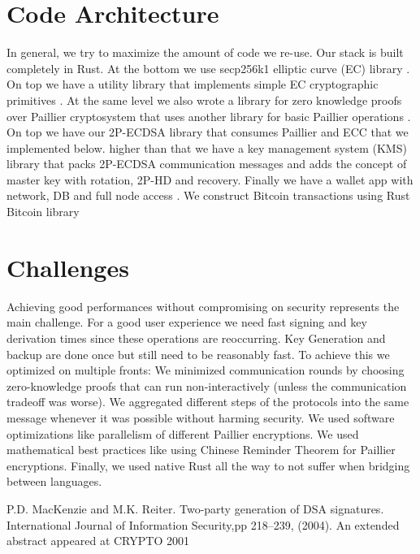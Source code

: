 \documentclass[runningheads]{llncs}
\begin{document}
{{\section{Code Architecture}
In general, we try to maximize the amount of code we re-use. Our stack is built completely in Rust. At the bottom we use secp256k1 elliptic curve (EC) library \cite{secp}. On top we have a utility library that implements simple EC cryptographic primitives \cite{curv}. At the same level we also wrote a library for zero knowledge proofs over Paillier cryptosystem \cite{zk-paillier} that uses another library for basic Paillier operations \cite{paillier}. On top we have our 2P-ECDSA library \cite{ecdsa} that consumes Paillier and ECC that we implemented below. higher than that we have a key management system (KMS) library \cite{kms} that packs 2P-ECDSA communication messages and adds the concept of master key with rotation, 2P-HD and recovery. Finally we have a wallet app with network, DB and full node access \cite{gotham}. We construct Bitcoin transactions using Rust Bitcoin library \cite{rust-bitcoin}

\section{Challenges}
Achieving good performances without compromising on security represents the main challenge. For a good user experience we need fast signing and key derivation times since these operations are reoccurring. Key Generation and backup are done once but still need to be reasonably fast. To achieve this we optimized on multiple fronts:  We minimized communication rounds by choosing zero-knowledge proofs that can run non-interactively (unless the communication tradeoff was worse). We aggregated different steps of the protocols into the same message whenever it was possible without harming security. We used software optimizations like parallelism of different Paillier encryptions. We used mathematical best practices like using Chinese Reminder Theorem for Paillier encryptions. Finally, we used native Rust all the way to not suffer when bridging between languages. 

\begin{thebibliography}{8}
P.D. MacKenzie and M.K. Reiter. Two-party generation of DSA signatures. International
Journal of Information Security,pp 218–239, (2004). An extended
abstract appeared at CRYPTO 2001


\end{thebibliography}}}
\end{document}
